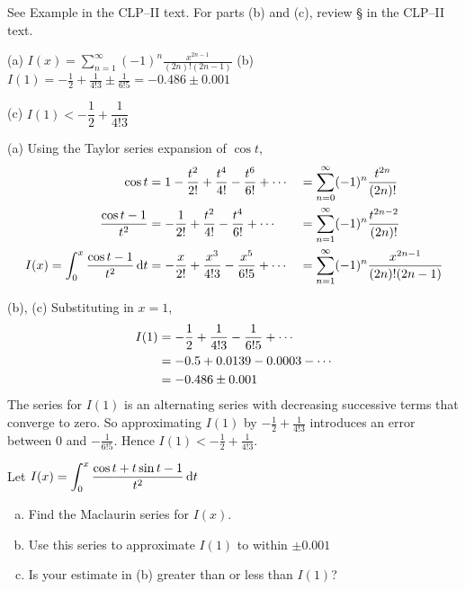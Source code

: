 \begin{hint}
See Example  in the
CLP--II text.
For parts (b) and (c), review  \S {} in the
CLP--II text.

\end{hint}

\begin{answer}
(a)
$\displaystyle I(x)=\sum\limits_{n=1}^\infty(-1)^n\frac{x^{2n-1}}{(2n)!(2n-1)}$
\qquad (b)
$\displaystyle I(1)= -\frac{1}{2}+\frac{1}{4!3} \pm  \frac{1}{6!5}
        =-0.486\pm0.001$

\noindent (c)
$I(1)<-\dfrac{1}{2}+\dfrac{1}{4!3}$

\end{answer}

\begin{solution} (a)
Using the Taylor series expansion of $\cos t$,
\begin{alignat*}{3}
\cos t&=1-\frac{t^2}{2!}+\frac{t^4}{4!}-\frac{t^6}{6!}+\cdots
         &&=\sum_{n=0}^\infty(-1)^n\frac{t^{2n}}{(2n)!}\\
\frac{\cos t-1}{t^2}&= -\frac{1}{2!}+\frac{t^2}{4!}-\frac{t^4}{6!}+\cdots
         &&=\sum_{n=1}^\infty(-1)^n\frac{t^{2n-2}}{(2n)!}\\
I(x)=\int_0^x \frac{\cos t-1}{t^2}\,\mathrm{d}t
      &=-\frac{x}{2!}+\frac{x^3}{4!3}-\frac{x^5}{6!5}+\cdots
      &&=\sum_{n=1}^\infty(-1)^n\frac{x^{2n-1}}{(2n)!(2n-1)}
\end{alignat*}


\noindent (b), (c)  Substituting in $x=1$,
\begin{align*}
I(1)&=-\frac{1}{2}+\frac{1}{4!3}-\frac{1}{6!5}
+\cdots\\
&=-0.5+0.0139-0.0003-\cdots\cr
&=-0.486\pm0.001
\end{align*}
The series for $I(1)$ is an alternating series with decreasing
successive terms that converge to zero. So approximating
$I(1)$ by $-\frac{1}{2}+\frac{1}{4!3}$ introduces an error
between $0$ and $-\frac{1}{6!5}$. Hence $I(1)<-\frac{1}{2}+\frac{1}{4!3}$.


\end{solution}


\begin{question}[1998A]
Let $\displaystyle I(x)=\int_0^x\frac{\cos t+t\sin t-1}{t^2}\,\mathrm{d}t$

\begin{enumerate}[(a)]
\item
Find the Maclaurin series for $I(x)$.
\item
Use this series to approximate $I(1)$ to within $\pm0.001$
\item
Is your estimate in (b) greater than or less than $I(1)$?
\end{enumerate}
\end{question}

